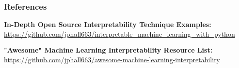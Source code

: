 \documentclass[11pt,
               aspectratio=169,
               hyperref={colorlinks}
               ]{beamer}
\begin{document}


			


	\begin{frame}[t, allowframebreaks]
	
		\frametitle{References}	
		
			\textbf{In-Depth Open Source Interpretability Technique Examples:}\\
			\small{\url{https://github.com/jphall663/interpretable_machine_learning_with_python}}
			
			\vspace{10pt}
			
			\textbf{"Awesome" Machine Learning Interpretability Resource List:}\\
			\small{\url{https://github.com/jphall663/awesome-machine-learning-interpretability}}
			
		
		\framebreak		
		
		\printbibliography
		
	\end{frame}
\end{document}
